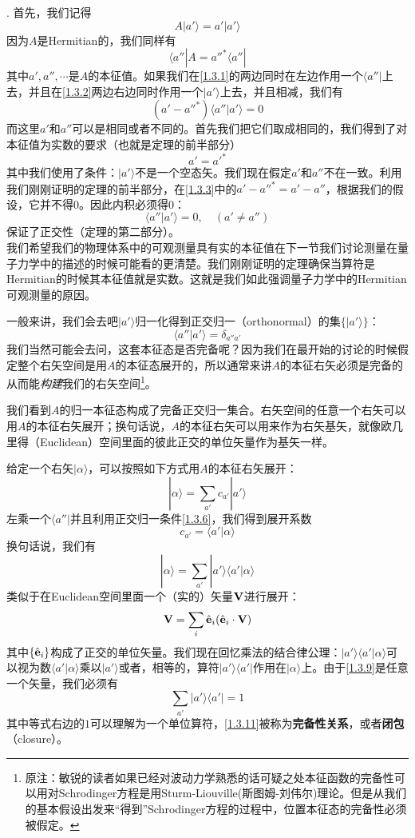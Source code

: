 \documentclass[UTF8,twoside]{ctexart}
\def\be{\begin{equation}}
\def\ee{\end{equation}}
\begin{document}
. 首先，我们记得
\be\label{1.3.1}
A|a'\rangle = a'|a'\rangle
\ee
因为$A$是Hermitian的，我们同样有
\be\label{1.3.2}
\langle a''|A = a''^*\langle a''|
\ee
其中$a',a'',\cdots$是$A$的本征值。如果我们在\eqref{1.3.1}的两边同时在左边作用一个$\langle a''|$上去，并且在\eqref{1.3.2}两边右边同时作用一个$|a'\rangle$上去，并且相减，我们有
\be\label{1.3.3}
(a'-a''^*)\langle a''|a'\rangle = 0
\ee
而这里$a'$和$a''$可以是相同或者不同的。首先我们把它们取成相同的，我们得到了对本征值为实数的要求（也就是定理的前半部分）
\be
a' = a'^*
\ee
其中我们使用了条件：$|a'\rangle$不是一个空态矢。我们现在假定$a'$和$a''$不在一致。利用我们刚刚证明的定理的前半部分，在\eqref{1.3.3}中的$a'-a''^*=a'-a''$，根据我们的假设，它并不得$0$。因此内积必须得$0$：
\be
\langle a''|a'\rangle = 0,\quad (a' \neq a'')
\ee
保证了正交性（定理的第二部分）。\ \\

我们希望我们的物理体系中的可观测量具有实的本征值在下一节我们讨论测量在量子力学中的描述的时候可能看的更清楚。我们刚刚证明的定理确保当算符是Hermitian的时候其本征值就是实数。这就是我们如此强调量子力学中的Hermitian可观测量的原因。

一般来讲，我们会去吧$|a'\rangle$归一化得到正交归一（orthonormal）的集$\{|a'\rangle\}$：
\be\label{1.3.6}
\langle a''|a'\rangle = \delta_{a''a'}
\ee
我们当然可能会去问，这套本征态是否完备呢？因为我们在最开始的讨论的时候假定整个右矢空间是用$A$的本征态展开的，所以通常来讲$A$的本征右矢必须是完备的从而能{\it 构建}我们的右矢空间\footnote{原注：敏锐的读者如果已经对波动力学熟悉的话可疑之处本征函数的完备性可以用对Schrodinger方程是用Sturm-Liouville(斯图姆-刘伟尔)理论。但是从我们的基本假设出发来``得到''Schrodinger方程的过程中，位置本征态的完备性必须被假定。}。\\


\noindent 我们看到$A$的归一本征态构成了完备正交归一集合。右矢空间的任意一个右矢可以用$A$的本征右矢展开；换句话说，$A$的本征右矢可以用来作为右矢基矢，就像欧几里得（Euclidean）空间里面的彼此正交的单位矢量作为基矢一样。

给定一个右矢$|\alpha\rangle$，可以按照如下方式用$A$的本征右矢展开：
\be\label{1.3.7}
|\alpha\rangle = \sum_{a'}c_{a'}|a'\rangle
\ee
左乘一个$\langle a''|$并且利用正交归一条件\eqref{1.3.6}，我们得到展开系数
\be
c_{a'} = \langle a'|\alpha\rangle
\ee
换句话说，我们有
\be\label{1.3.9}
|\alpha\rangle = \sum_{a'}|a'\rangle\langle a'|\alpha\rangle
\ee
类似于在Euclidean空间里面一个（实的）矢量$\bf V$进行展开：
\be
{\bf V} = \sum_i\hat{\bf e}_i(\hat{\bf e}_i\cdot\bf V)
\ee
其中$\{\hat{\bf e}_i\}$构成了正交的单位矢量。我们现在回忆乘法的结合律公理：$|a'\rangle\langle a'|\alpha\rangle$可以视为数$\langle a'|\alpha\rangle$乘以$|a'\rangle$或者，相等的，算符$|a'\rangle\langle a'|$作用在$|\alpha\rangle$上。由于\eqref{1.3.9}是任意一个矢量，我们必须有
\be\label{1.3.11}
\sum_{a'}|a'\rangle\langle a'| = 1
\ee
其中等式右边的$1$可以理解为一个单位算符，\eqref{1.3.11}被称为{\bf 完备性关系}，或者{\bf 闭包}（closure）。
\end{document}
